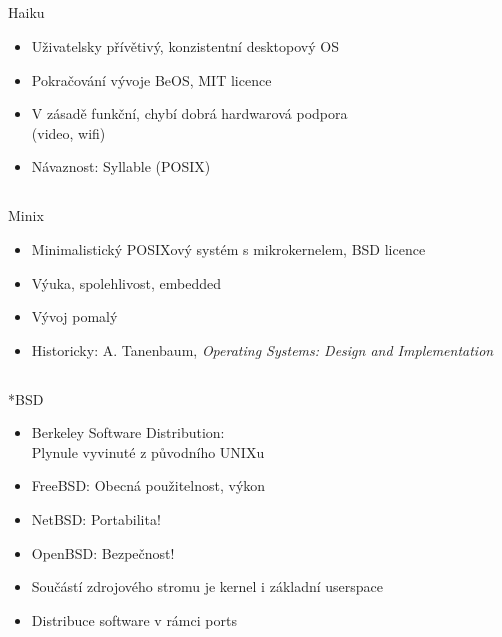 \documentclass{beamer}
\begin{document}
\subsection{}
\begin{frame}{Haiku}
\begin{itemize}
\item Uživatelsky přívětivý, konzistentní desktopový OS
\item Pokračování vývoje BeOS, MIT licence
\item V zásadě funkční, chybí dobrá hardwarová podpora\\ (video, wifi)
\item Návaznost: Syllable (POSIX)
\end{itemize}
\end{frame}

\subsection{}
\begin{frame}{Minix}
\begin{itemize}
\item Minimalistický POSIXový systém s mikrokernelem, BSD licence
\item Výuka, spolehlivost, embedded
\item Vývoj pomalý
\item Historicky: A. Tanenbaum, {\em Operating Systems: Design and Implementation}
\end{itemize}
\end{frame}

\subsection{}
\begin{frame}{*BSD}
\begin{itemize}
\item Berkeley Software Distribution: \\ Plynule vyvinuté z původního UNIXu
\item FreeBSD: Obecná použitelnost, výkon
\item NetBSD: Portabilita!
\item OpenBSD: Bezpečnost!
\item Součástí zdrojového stromu je kernel i základní userspace
\item Distribuce software v rámci ports
\end{itemize}
\end{frame}
\end{document}
